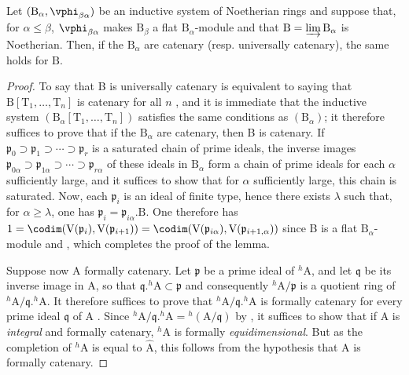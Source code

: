 \begin{lemma}[18.7.5.1]
\label{IV.18.7.5.1}
Let $(\mathrm{B}_\alpha,\vphi_{\beta\alpha})$ be an inductive system of Noetherian rings and suppose that, for $\alpha\leq\beta$, $\vphi_{\beta\alpha}$ makes $\mathrm{B}_\beta$ a flat $\mathrm{B}_\alpha$-module and that $\mathrm{B}=\varinjlim\mathrm{B}_\alpha$ is Noetherian.
Then, if the $\mathrm{B}_\alpha$ are catenary (resp. universally catenary), the same holds for $\mathrm{B}$.
\end{lemma}

\begin{proof}
To say that B is universally catenary is equivalent to saying that $\mathrm{B}[\mathrm{T}_1,\ldots,\mathrm{T}_n]$ is catenary for all $n$ , and it is immediate that the inductive system $(\mathrm{B}_\alpha[\mathrm{T}_1,\ldots,\mathrm{T}_n])$ satisfies the same conditions as $(\mathrm{B}_\alpha)$;
it therefore suffices to prove that if the $\mathrm{B}_\alpha$ are catenary, then B is catenary.
If $\mathfrak{p}_0\supset\mathfrak{p}_1\supset\cdots\supset\mathfrak{p}_r$ is a saturated chain of prime ideals, the inverse images $\mathfrak{p}_{0\alpha}\supset\mathfrak{p}_{1\alpha}\supset\cdots\supset\mathfrak{p}_{r\alpha}$ of these ideals in $\mathrm{B}_\alpha$ form a chain of prime ideals for each $\alpha$ sufficiently large, and it suffices to show that for $\alpha$ sufficiently large, this chain is saturated.
Now, each $\mathfrak{p}_i$ is an ideal of finite type, hence there exists $\lambda$ such that, for $\alpha\geq\lambda$, one has $\mathfrak{p}_i=\mathfrak{p}_{i\alpha}.\mathrm{B}$.
One therefore has $1=\codim(\mathrm{V}(\mathfrak{p}_i),\mathrm{V}(\mathfrak{p}_{i+1}))=\codim(\mathrm{V}(\mathfrak{p}_{i\alpha}),\mathrm{V}(\mathfrak{p}_{i+1,\alpha}))$ since B is a flat $\mathrm{B}_\alpha$-module  and , which completes the proof of the lemma.

Suppose now A formally catenary.
Let $\mathfrak{p}$ be a prime ideal of ${}^h\!\mathrm{A}$, and let $\mathfrak{q}$ be its inverse image in A, so that $\mathfrak{q}.{}^h\!\mathrm{A}\subset\mathfrak{p}$ and consequently ${}^h\!\mathrm{A}/\mathfrak{p}$ is a quotient ring of ${}^h\!\mathrm{A}/\mathfrak{q}.{}^h\!\mathrm{A}$.  It therefore suffices to prove that ${}^h\!\mathrm{A}/\mathfrak{q}.{}^h\!\mathrm{A}$ is formally catenary for every prime ideal $\mathfrak{q}$ of A .  Since ${}^h\!\mathrm{A}/\mathfrak{q}.{}^h\!\mathrm{A}={}^h(\mathrm{A}/\mathfrak{q})$ by , it suffices  to show that if A is \emph{integral} and formally catenary, ${}^h\!\mathrm{A}$ is formally \emph{equidimensional}.
But as the completion of ${}^h\!\mathrm{A}$ is equal to $\hat{\mathrm{A}}$, this follows from the hypothesis that A is formally catenary.


\end{proof}
